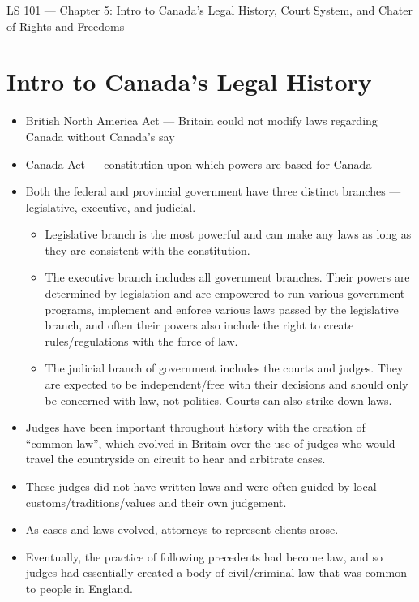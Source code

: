 \documentclass{article}
\author{Clement Tsang}
\begin{document}
\begin{center}
    \Large{LS 101 --- Chapter 5: Intro to Canada's Legal History, Court System, and Chater of Rights and Freedoms}
\end{center}

\section{Intro to Canada's Legal History}
\begin{itemize}
    \item British North America Act --- Britain could not modify laws regarding Canada without Canada's say
    \item Canada Act --- constitution upon which powers are based for Canada
    \item Both the federal and provincial government have three distinct branches --- legislative, executive, and judicial.
        \begin{itemize}
            \item Legislative branch is the most powerful and can make any laws as long as they are consistent with the constitution.
            \item The executive branch includes all government branches.  Their powers are determined by legislation and are empowered to run various government programs, implement and enforce various laws passed by the legislative branch, and often their powers also include the right to create rules/regulations with the force of law.
            \item The judicial branch of government includes the courts and judges.  They are expected to be independent/free with their decisions and should only be concerned with law, not politics.  Courts can also strike down laws.
        \end{itemize}
    \item Judges have been important throughout history with the creation of ``common law'', which evolved in Britain over the use of judges who would travel the countryside on circuit to hear and arbitrate cases.
    \item These judges did not have written laws and were often guided by local customs/traditions/values and their own judgement.
    \item As cases and laws evolved, attorneys to represent clients arose.
    \item Eventually, the practice of following precedents had become law, and so judges had essentially created a body of civil/criminal law that was common to people in England.
\end{itemize}
\end{document}
